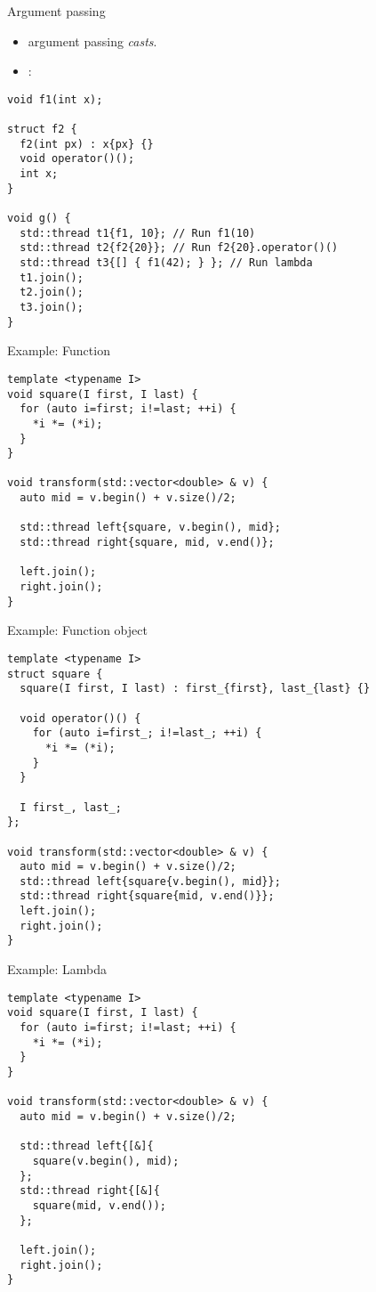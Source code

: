 \begin{frame}[t,fragile]{Argument passing}
\begin{itemize}
  \item {} argument passing  
        \emph{casts}.
  \item {}:
\end{itemize}
\begin{lstlisting}
void f1(int x);

struct f2 {
  f2(int px) : x{px} {}
  void operator()();
  int x;
}

void g() {
  std::thread t1{f1, 10}; // Run f1(10)
  std::thread t2{f2{20}}; // Run f2{20}.operator()()
  std::thread t3{[] { f1(42); } }; // Run lambda
  t1.join();
  t2.join();
  t3.join();
}
\end{lstlisting}
\end{frame}

\begin{frame}[t,fragile]{Example: Function}
\begin{lstlisting}
template <typename I>
void square(I first, I last) {
  for (auto i=first; i!=last; ++i) {
    *i *= (*i);
  }
}

void transform(std::vector<double> & v) {
  auto mid = v.begin() + v.size()/2;

  std::thread left{square, v.begin(), mid};
  std::thread right{square, mid, v.end()};

  left.join();
  right.join();
}
\end{lstlisting}
\end{frame}

\begin{frame}[t,fragile]{Example: Function object}
\begin{lstlisting}
template <typename I>
struct square {
  square(I first, I last) : first_{first}, last_{last} {}

  void operator()() {
    for (auto i=first_; i!=last_; ++i) {
      *i *= (*i);
    }
  }

  I first_, last_;
};

void transform(std::vector<double> & v) {
  auto mid = v.begin() + v.size()/2;
  std::thread left{square{v.begin(), mid}};
  std::thread right{square{mid, v.end()}};
  left.join();
  right.join();
}
\end{lstlisting}
\end{frame}

\begin{frame}[t,fragile]{Example: Lambda}
\begin{lstlisting}
template <typename I>
void square(I first, I last) {
  for (auto i=first; i!=last; ++i) {
    *i *= (*i);
  }
}

void transform(std::vector<double> & v) {
  auto mid = v.begin() + v.size()/2;

  std::thread left{[&]{
    square(v.begin(), mid); 
  };
  std::thread right{[&]{
    square(mid, v.end()); 
  };

  left.join();
  right.join();
}
\end{lstlisting}
\end{frame}

